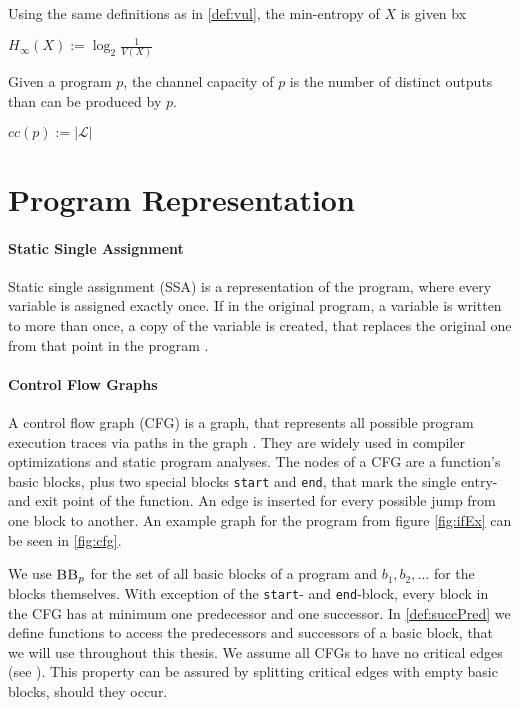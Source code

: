 \begin{definition}
    Using the same definitions as in \ref{def:vul}, the min-entropy of $X$ is given bx
    \begin{center}
        $H_\infty (X) := \log_2 \frac{1}{V(X)}$
    \end{center}
\end{definition}

\begin{definition}
    Given a program $p$, the channel capacity of $p$ is the number of distinct outputs than can be produced by $p$.
    \begin{center}
        $cc(p) := |\mathcal{L}|$
    \end{center}
\end{definition}


\section{Program Representation}

\paragraph{Static Single Assignment}
Static single assignment (SSA) is a representation of the program, where every variable is assigned exactly once. If in the original program, a variable is written to more than once, a copy of the variable is created, that replaces the original one from that point in the program \cite{rosen88}.

\paragraph{Control Flow Graphs}
A control flow graph (CFG) is a graph, that represents all possible program execution traces via paths in the graph \cite{allen70}. They are widely used in compiler optimizations and static program analyses. The nodes of a CFG are a function's basic blocks, plus two special blocks \texttt{start} and \texttt{end}, that mark the single entry- and exit point of the function. An edge is inserted for every possible jump from one block to another. An example graph for the program from figure \ref{fig:ifEx} can be seen in \ref{fig:cfg}.

We use $\mbb_p$ for the set of all basic blocks of a program \p and $b_1, b_2, ...$ for the blocks themselves. With exception of the \texttt{start}- and \texttt{end}-block, every block in the CFG has at minimum one predecessor and one successor. In \ref{def:succPred} we define functions to access the predecessors and successors of a basic block, that we will use throughout this thesis. We assume all CFGs to have no critical edges (see \cite{dragoonBook}). This property can be assured by splitting critical edges with empty basic blocks, should they occur. 

